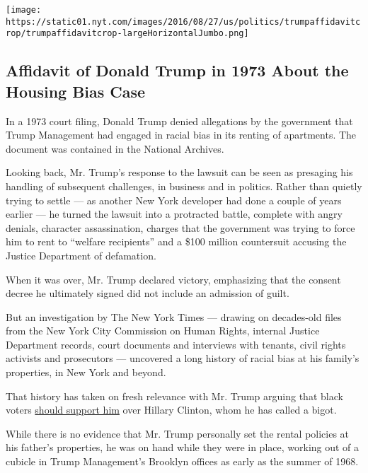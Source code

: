 \href{https://www.nytimes.com/interactive/2016/08/27/us/politics/trump-affidavit.html}{}

\texttt{[image: https://static01.nyt.com/images/2016/08/27/us/politics/trumpaffidavitcrop/trumpaffidavitcrop-largeHorizontalJumbo.png]}

\hypertarget{affidavit-of-donald-trump-in-1973-about-the-housing-bias-case}{%
\subsection{Affidavit of Donald Trump in 1973 About the Housing Bias
Case}\label{affidavit-of-donald-trump-in-1973-about-the-housing-bias-case}}

In a 1973 court filing, Donald Trump denied allegations by the
government that Trump Management had engaged in racial bias in its
renting of apartments. The document was contained in the National
Archives.

Looking back, Mr. Trump's response to the lawsuit can be seen as
presaging his handling of subsequent challenges, in business and in
politics. Rather than quietly trying to settle --- as another New York
developer had done a couple of years earlier --- he turned the lawsuit
into a protracted battle, complete with angry denials, character
assassination, charges that the government was trying to force him to
rent to ``welfare recipients'' and a \$100 million countersuit accusing
the Justice Department of defamation.

When it was over, Mr. Trump declared victory, emphasizing that the
consent decree he ultimately signed did not include an admission of
guilt.

But an investigation by The New York Times --- drawing on decades-old
files from the New York City Commission on Human Rights, internal
Justice Department records, court documents and interviews with tenants,
civil rights activists and prosecutors --- uncovered a long history of
racial bias at his family's properties, in New York and beyond.

That history has taken on fresh relevance with Mr. Trump arguing that
black voters
\href{http://www.nytimes.com/2016/08/25/us/politics/donald-trump-black-voters.html}{should
support him} over Hillary Clinton, whom he has called a bigot.

While there is no evidence that Mr. Trump personally set the rental
policies at his father's properties, he was on hand while they were in
place, working out of a cubicle in Trump Management's Brooklyn offices
as early as the summer of 1968.

